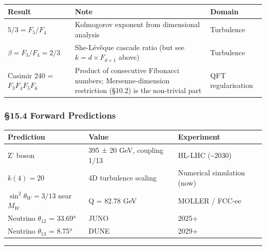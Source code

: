 \documentclass[
  11pt,
  a4paper]{article}
\begin{document}
\begin{longtable}[]{@{}
  >{\raggedright\arraybackslash}p{}
  >{\raggedright\arraybackslash}p{}
  >{\raggedright\arraybackslash}p{}@{}}
\toprule\noalign{}
\begin{minipage}[b]{\linewidth}\raggedright
Result
\end{minipage} & \begin{minipage}[b]{\linewidth}\raggedright
Note
\end{minipage} & \begin{minipage}[b]{\linewidth}\raggedright
Domain
\end{minipage} \\
\midrule\noalign{}
\endhead
\bottomrule\noalign{}
\endlastfoot
\(5/3 = F_5/F_4\) & Kolmogorov exponent from dimensional analysis &
Turbulence \\
\(\beta = F_3/F_4 = 2/3\) & She-Lévêque cascade ratio (but see
\(k = d \times F_{d+1}\) above) & Turbulence \\
Casimir 240 = \(F_3 F_4 F_5 F_6\) & Product of consecutive Fibonacci
numbers; Mersenne-dimension restriction (§10.2) is the non-trivial part
& QFT regularisation \\
\end{longtable}

\subsubsection{§15.4 Forward Predictions}\label{forward-predictions}

\begin{longtable}[]{@{}lll@{}}
\toprule\noalign{}
Prediction & Value & Experiment \\
\midrule\noalign{}
\endhead
\bottomrule\noalign{}
\endlastfoot
Z' boson & 395 ± 20 GeV, coupling 1/13 & HL-LHC (\textasciitilde2030) \\
\(k(4) = 20\) & 4D turbulence scaling & Numerical simulation (now) \\
\(\sin^2\theta_W = 3/13\) near \(M_W\) & Q = 82.78 GeV & MOLLER /
FCC-ee \\
Neutrino \(\theta_{12}\) = 33.69° & JUNO & 2025+ \\
Neutrino \(\theta_{13}\) = 8.75° & DUNE & 2029+ \\
\end{longtable}

\begin{center}\rule{0.5\linewidth}{0.5pt}\end{center}
\end{document}
